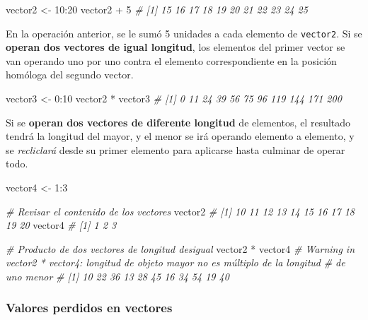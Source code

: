 \documentclass[
]{article}
\newenvironment{Shaded}{\begin{snugshade}}{\end{snugshade}}
\newcommand{\CommentTok}[1]{\textcolor[rgb]{0.56,0.35,0.01}{\textit{#1}}}
\newcommand{\DecValTok}[1]{\textcolor[rgb]{0.00,0.00,0.81}{#1}}
\newcommand{\NormalTok}[1]{#1}
\newcommand{\OtherTok}[1]{\textcolor[rgb]{0.56,0.35,0.01}{#1}}
\newcommand{\SpecialCharTok}[1]{\textcolor[rgb]{0.00,0.00,0.00}{#1}}
\theoremstyle{definition}
\theoremstyle{definition}
\theoremstyle{definition}
\theoremstyle{definition}
\theoremstyle{remark}
\begin{document}
\begin{Shaded}
\begin{Highlighting}[]
\NormalTok{vector2 }\OtherTok{\textless{}{-}} \DecValTok{10}\SpecialCharTok{:}\DecValTok{20}
\NormalTok{vector2 }\SpecialCharTok{+} \DecValTok{5}
\CommentTok{\#  [1] 15 16 17 18 19 20 21 22 23 24 25}
\end{Highlighting}
\end{Shaded}

En la operación anterior, se le sumó 5 unidades a cada elemento de \texttt{vector2}. Si se \textbf{operan dos vectores de igual longitud}, los elementos del primer vector se van operando uno por uno contra el elemento correspondiente en la posición homóloga del segundo vector.

\begin{Shaded}
\begin{Highlighting}[]
\NormalTok{vector3 }\OtherTok{\textless{}{-}} \DecValTok{0}\SpecialCharTok{:}\DecValTok{10}
\NormalTok{vector2 }\SpecialCharTok{*}\NormalTok{ vector3}
\CommentTok{\#  [1]   0  11  24  39  56  75  96 119 144 171 200}
\end{Highlighting}
\end{Shaded}

Si se \textbf{operan dos vectores de diferente longitud} de elementos, el resultado tendrá la longitud del mayor, y el menor se irá operando elemento a elemento, y se \emph{recliclará} desde su primer elemento para aplicarse hasta culminar de operar todo.

\begin{Shaded}
\begin{Highlighting}[]
\NormalTok{vector4 }\OtherTok{\textless{}{-}} \DecValTok{1}\SpecialCharTok{:}\DecValTok{3}

\CommentTok{\# Revisar el contenido de los vectores}
\NormalTok{vector2}
\CommentTok{\#  [1] 10 11 12 13 14 15 16 17 18 19 20}
\NormalTok{vector4}
\CommentTok{\# [1] 1 2 3}

\CommentTok{\# Producto de dos vectores de longitud desigual}
\NormalTok{vector2 }\SpecialCharTok{*}\NormalTok{ vector4}
\CommentTok{\# Warning in vector2 * vector4: longitud de objeto mayor no es múltiplo de la longitud}
\CommentTok{\# de uno menor}
\CommentTok{\#  [1] 10 22 36 13 28 45 16 34 54 19 40}
\end{Highlighting}
\end{Shaded}

\hypertarget{valores-perdidos-en-vectores}{%
\subsubsection{Valores perdidos en vectores}\label{valores-perdidos-en-vectores}}
\end{document}
